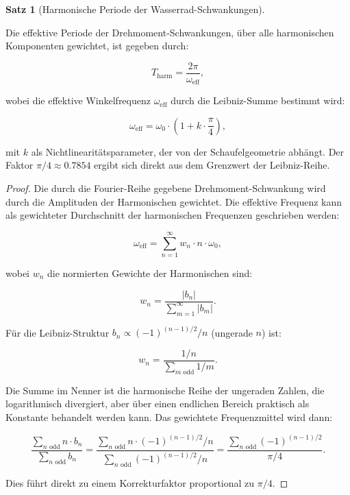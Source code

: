 \documentclass[a4paper,12pt]{article}
\theoremstyle{definition}
\newtheorem{satz}{Satz}
\begin{document}
\begin{satz}[Harmonische Periode der Wasserrad-Schwankungen]
  \label{satz:harmonische_periode}
  
  Die effektive Periode der Drehmoment-Schwankungen, über alle harmonischen Komponenten gewichtet, ist gegeben durch:
  
  \begin{equation}
    T_{\text{harm}} = \frac{2\pi}{\omega_{\text{eff}}},
  \end{equation}
  
  wobei die effektive Winkelfrequenz $\omega_{\text{eff}}$ durch die Leibniz-Summe bestimmt wird:
  
  \begin{equation}
    \omega_{\text{eff}} = \omega_0 \cdot \left(1 + k \cdot \frac{\pi}{4}\right),
    \label{eq:omega_eff_pi4}
  \end{equation}
  
  mit $k$ als Nichtlinearitätsparameter, der von der Schaufelgeometrie abhängt. Der Faktor $\pi/4 \approx 0.7854$ ergibt sich direkt aus dem Grenzwert der Leibniz-Reihe.
\end{satz}

\begin{proof}
  Die durch die Fourier-Reihe gegebene Drehmoment-Schwankung wird durch die Amplituden der Harmonischen gewichtet. Die effektive Frequenz kann als gewichteter Durchschnitt der harmonischen Frequenzen geschrieben werden:
  
  \begin{equation}
    \omega_{\text{eff}} = \sum_{n=1}^{\infty} w_n \cdot n \cdot \omega_0,
  \end{equation}
  
  wobei $w_n$ die normierten Gewichte der Harmonischen sind:
  
  \begin{equation}
    w_n = \frac{|b_n|}{\sum_{m=1}^{\infty}|b_m|}.
  \end{equation}
  
  Für die Leibniz-Struktur $b_n \propto (-1)^{(n-1)/2}/n$ (ungerade $n$) ist:
  
  \begin{equation}
    w_n = \frac{1/n}{\sum_{m \text{ odd}} 1/m}.
  \end{equation}
  
  Die Summe im Nenner ist die harmonische Reihe der ungeraden Zahlen, die logarithmisch divergiert, aber über einen endlichen Bereich praktisch als Konstante behandelt werden kann. Das gewichtete Frequenzmittel wird dann:
  
  \begin{equation}
    \frac{\sum_{n \text{ odd}} n \cdot b_n}{\sum_{n \text{ odd}} b_n} = \frac{\sum_{n \text{ odd}} n \cdot (-1)^{(n-1)/2}/n}{\sum_{n \text{ odd}} (-1)^{(n-1)/2}/n} = \frac{\sum_{n \text{ odd}} (-1)^{(n-1)/2}}{\pi/4}.
  \end{equation}
  
  Dies führt direkt zu einem Korrekturfaktor proportional zu $\pi/4$.
\end{proof}
\end{document}
